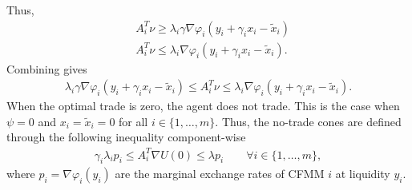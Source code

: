 Thus,
\begin{align}
    &A_i^{T}\nu \ge \lambda_i\gamma\nabla\varphi_i(y_i
    +\gamma_ix_i -\tilde{x}_i)\\
    &A_i^{T}\nu \le \lambda_i\nabla\varphi_i(y_i
    +\gamma_ix_i -\tilde{x}_i).
\end{align}
Combining gives
\begin{align}
    \lambda_i\gamma\nabla\varphi_i(y_i
    +\gamma_ix_i -\tilde{x}_i)\le
    A_i^{T}\nu \le \lambda_i \nabla\varphi_i(y_i
    +\gamma_ix_i -\tilde{x}_i).
\end{align}
When the optimal trade is zero, the agent does not trade. This is the
case when $\psi =0$ and $x_i=\tilde{x}_i=0$ for all $i \in \{1,\ldots,m\}$.
Thus, the no-trade cones are defined through the following inequality
component-wise
\begin{align}
    \gamma_i\lambda_i p_i \le A_i^{T} \nabla U(0)\le\lambda p_i \qquad
    \forall i \in \{1,\ldots,m\},
\end{align}
where $p_i = \nabla \varphi_i(y_i)$ are the marginal exchange rates of CFMM
$i$ at liquidity $y_i$.
